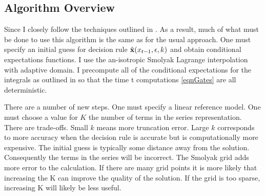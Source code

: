 \documentclass[12pt]{article}
\begin{document}


\subsection{Algorithm Overview}


Since I closely follow the techniques outlined in  \citep{Judd2013,Judd2014}. 
As a result, much of what must be done to use this  algorithm is 
the same as for the usual approach.
One must specify an initial guess for decision rule $\hat{\mathbf{x}}(x_{t-1},\epsilon,k)$ and obtain conditional expectations functions.
I use the an-isotropic Smolyak Lagrange interpolation with adaptive domain.
I precompute all of the conditional expectations for the integrals as outlined in  \citep{JuddIntegrals} so that the time t computations \ref{eqnGates} are all 
deterministic.




There are a number of new steps. 
One must  specify a linear reference model.
  One must choose a value for
$K$ the number of terms in the series representation.  There are trade-offs.
Small $k$  means more truncation error. 
Large $k$ corresponds to more accuracy when the decision rule is accurate but
is computationally more expensive. The initial guess is 
typically some distance away from the solution.   Consequently the
terms in the series will be incorrect.  The Smolyak grid adds more error to
the calculation.  If there are many grid points it is more likely that 
increasing the K can improve the quality of the solution.  If the grid is
too sparse, increasing K will likely be less useful. 
\end{document}
